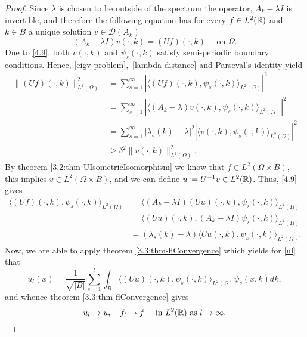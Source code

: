 \begin{theorem}
\begin{proof}
		Since $\lambda$ is chosen to be outside of the spectrum the operator, $A_{k} - \lambda I$ is invertible, and therefore the following equation has for every $f \in L^{2}(\mathbb{R})$ and $k \in B$ a unique solution $v \in \mathcal{D}(A_{k})$
		\begin{equation}
			(A_{k} - \lambda I) v(\cdot, k) = (Uf)(\cdot, k) \quad \text{ on } \Omega. \label{4.9}			
		\end{equation}
		Due to \eqref{4.9}, both $v(\cdot, k)$ and $\psi_{s}(\cdot, k)$ satisfy semi-periodic boundary conditions. Hence, \eqref{eigv-problem}, \eqref{lambda-distance} and Parseval's identity yield
		\begin{align*}
			\| (Uf)(\cdot, k)\|^{2}_{L^{2}(\Omega)} & = \sum_{s=1}^{\infty} |\langle (Uf)(\cdot, k), \psi_{s}(\cdot, k)\rangle_{L^{2}(\Omega)}|^{2} \\
			& = \sum_{s=1}^{\infty}|\langle (A_{k} - \lambda) v(\cdot, k), \psi_{s}(\cdot, k)\rangle_{L^{2}(\Omega)}|^{2} \\
			& = \sum_{s=1}^{\infty} |\lambda_{s}(k) - \lambda|^{2} |\langle v(\cdot, k), \psi_{s}(\cdot, k)\rangle_{L^{2}(\Omega)}|^{2} \\
			& \geq \delta^{2} \| v(\cdot, k)\|^{2}_{L^{2}(\Omega)}.
		\end{align*}
		By theorem \ref{3.2:thm-UIsometricIsomorphism} we know that $f \in L^{2}(\Omega \times B)$, this implies $v \in L^{2}(\Omega \times B)$, and we can define $u \coloneqq U^{-1} v \in L^{2}(\mathbb{R})$. Thus, \eqref{4.9} gives
			\begin{align*}
				\langle (Uf)(\cdot, k), \psi_{s}(\cdot, k) \rangle_{L^{2}(\Omega)} & = \langle (A_{k} - \lambda I)(Uu)(\cdot, k), \psi_{s}(\cdot, k) \rangle_{L^{2}(\Omega)} \\
					& = \langle (Uu)(\cdot,k), (A_{k} - \lambda I) \psi_{s}(\cdot, k) \rangle_{L^{2}(\Omega)} \\
					& = (\lambda_{s}(k) - \lambda) \langle Uu(\cdot, k), \psi_{s}(\cdot, k) \rangle_{L^{2}(\Omega)}.
			\end{align*}
		Now, we are able to apply theorem \ref{3.3:thm-flConvergence} which yields for \eqref{ul} that
			\[ u_{l}(x) = \frac{1}{\sqrt{|B|}} \sum_{s=1}^{l} \int_{B} \langle (Uu)(\cdot, k), \psi_{s}(\cdot, k)\rangle_{L^{2}(\Omega)} \psi_{s}(x, k) dk, \]
		and whence theorem \ref{3.3:thm-flConvergence} gives
			\begin{equation}
				u_{l} \rightarrow u, \quad f_{l} \rightarrow f \quad \text{ in } L^{2}(\mathbb{R}) \text{ as } l \rightarrow \infty. \label{ulflconvergence}
			\end{equation}

\end{proof}
\end{theorem}
